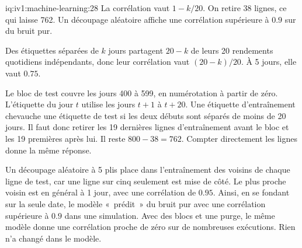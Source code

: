 \begin{solution}{iq:iv1:machine-learning:28}
La corrélation vaut $1 - k/20$. On retire 38 lignes, ce qui laisse 762. Un découpage aléatoire affiche une corrélation supérieure à $0.9$ sur du bruit pur.

Des étiquettes séparées de $k$ jours partagent $20 - k$ de leurs 20 rendements quotidiens indépendants, donc leur corrélation vaut $(20 - k)/20$. À 5 jours, elle vaut $0.75$.

Le bloc de test couvre les jours 400 à 599, en numérotation à partir de zéro. L'étiquette du jour $t$ utilise les jours $t + 1$ à $t + 20$. Une étiquette d'entraînement chevauche une étiquette de test si les deux débuts sont séparés de moins de 20 jours. Il faut donc retirer les 19 dernières lignes d'entraînement avant le bloc et les 19 premières après lui. Il reste $800 - 38 = 762$. Compter directement les lignes donne la même réponse.

Un découpage aléatoire à 5 plis place dans l'entraînement des voisins de chaque ligne de test, car une ligne sur cinq seulement est mise de côté. Le plus proche voisin est en général à 1 jour, avec une corrélation de $0.95$. Ainsi, en se fondant sur la seule date, le modèle «~prédit~» du bruit pur avec une corrélation supérieure à $0.9$ dans une simulation. Avec des blocs et une purge, le même modèle donne une corrélation proche de zéro sur de nombreuses exécutions. Rien n'a changé dans le modèle.



\end{solution}

